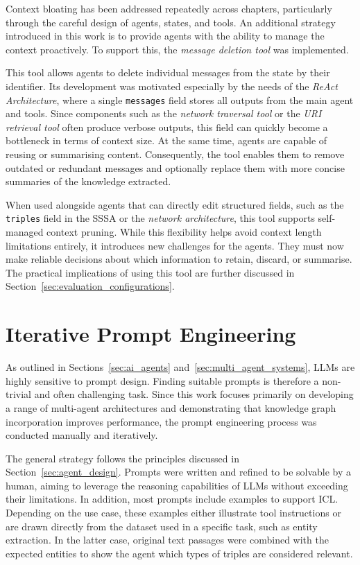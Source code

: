 \documentclass[a4paper,oneside,bibliography=totoc]{scrbook}
\begin{document}
Context bloating has been addressed repeatedly across chapters, particularly through the careful design of agents, states, and tools. An additional strategy introduced in this work is to provide agents with the ability to manage the context proactively. To support this, the \textit{message deletion tool} was implemented.

This tool allows agents to delete individual messages from the state by their identifier. Its development was motivated especially by the needs of the \textit{ReAct Architecture}, where a single \texttt{messages} field stores all outputs from the main agent and tools. Since components such as the \textit{network traversal tool} or the \textit{URI retrieval tool} often produce verbose outputs, this field can quickly become a bottleneck in terms of context size. At the same time, agents are capable of reusing or summarising content. Consequently, the tool enables them to remove outdated or redundant messages and optionally replace them with more concise summaries of the knowledge extracted.

When used alongside agents that can directly edit structured fields, such as the \texttt{triples} field in the \ac{SSSA} or the \textit{network architecture}, this tool supports self-managed context pruning. While this flexibility helps avoid context length limitations entirely, it introduces new challenges for the agents. They must now make reliable decisions about which information to retain, discard, or summarise. The practical implications of using this tool are further discussed in Section~\ref{sec:evaluation_configurations}.

\section{Iterative Prompt Engineering}
\label{sec:iterative_prompt_engineering}

As outlined in Sections~\ref{sec:ai_agents} and~\ref{sec:multi_agent_systems}, \acp{LLM} are highly sensitive to prompt design. Finding suitable prompts is therefore a non-trivial and often challenging task. Since this work focuses primarily on developing a range of multi-agent architectures and demonstrating that knowledge graph incorporation improves performance, the prompt engineering process was conducted manually and iteratively.

The general strategy follows the principles discussed in Section~\ref{sec:agent_design}. Prompts were written and refined to be solvable by a human, aiming to leverage the reasoning capabilities of \acp{LLM} without exceeding their limitations. In addition, most prompts include examples to support \ac{ICL}. Depending on the use case, these examples either illustrate tool instructions or are drawn directly from the dataset used in a specific task, such as entity extraction. In the latter case, original text passages were combined with the expected entities to show the agent which types of triples are considered relevant.
\end{document}
